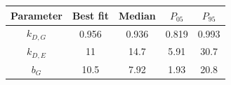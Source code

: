 \begin{tabular}{ccccc}
\toprule
Parameter & Best fit & Median & $P_{05}$ & $P_{95}$\\
\midrule
$k_{D,G}$ & 0.956 & 0.936 & 0.819 & 0.993\\
$k_{D,E}$ & 11 & 14.7 & 5.91 & 30.7\\
$b_G$ & 10.5 & 7.92 & 1.93 & 20.8\\
\bottomrule
\end{tabular}
